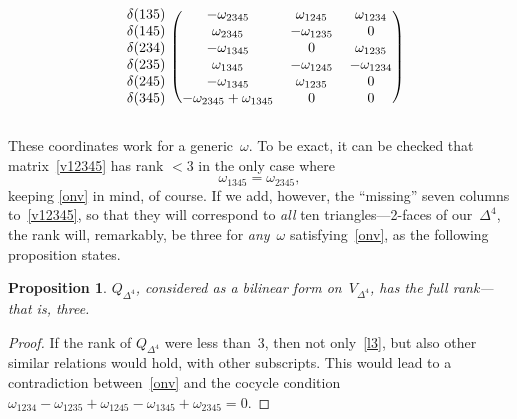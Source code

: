 \documentclass[12pt]{article}
\newtheorem{proposition}{Proposition}
\theoremstyle{definition}
\theoremstyle{remark}
\begin{document}
\begin{equation}
\begin{blockarray}{cccc}
\begin{block}{c(ccc)}
\delta(135) & -\omega _{2345}                & \omega _{1245}                & \omega _{1234}                \\
\delta(145) & \omega _{2345}                 & -\omega _{1235}               &             0                 \\
\delta(234) & -\omega _{1345}                &          0                    & \omega _{1235}                \\
\delta(235) & \omega _{1345}                 & -\omega _{1245}               & -\omega _{1234}               \\
\delta(245) & -\omega _{1345}                & \omega _{1235}                &             0                 \\
\delta(345) & -\omega _{2345}+\omega _{1345} &          0                    &             0                 \\
    \end{block}
  \end{blockarray}
\end{equation}

These coordinates work for a generic~$\omega$. To be exact, it can be checked that matrix~\eqref{v12345} has rank $<3$ in the only case where
\begin{equation}\label{l3}
\omega _{1345} = \omega _{2345},
\end{equation}
keeping \eqref{onv} in mind, of course. If we add, however, the ``missing'' seven columns to~\eqref{v12345}, so that they will correspond to \emph{all} ten triangles---2-faces of our~$\Delta^4$, the rank will, remarkably, be three for \emph{any}~$\omega$ satisfying~\eqref{onv}, as the following proposition states.

\begin{proposition}\label{p:Qr}
$Q_{\Delta^4}$, considered as a bilinear form on~$V_{\Delta^4}$, has the full rank---that is, three.
\end{proposition}

\begin{proof}
If the rank of $Q_{\Delta^4}$ were less than~3, then not only~\eqref{l3}, but also other similar relations would hold, with other subscripts. This would lead to a contradiction between~\eqref{onv} and the cocycle condition $\omega _{1234}-\omega _{1235}+\omega _{1245}-\omega _{1345}+\omega _{2345}=0$.
\end{proof}
\end{document}
